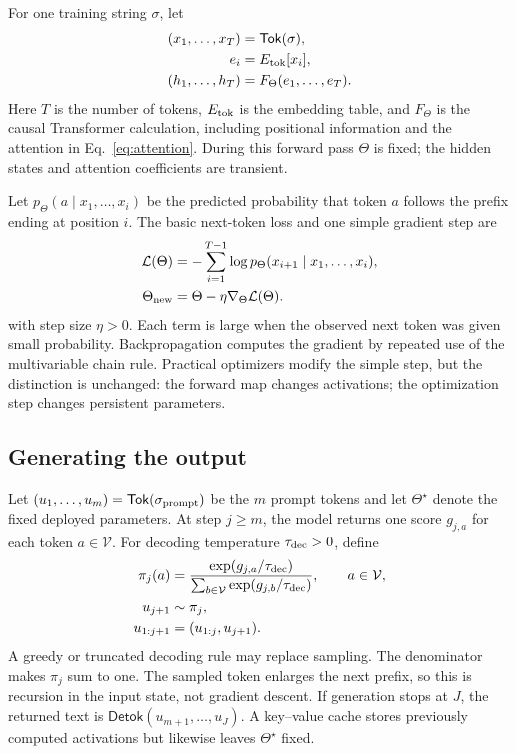 \documentclass[
  aps,
  reprint,
  superscriptaddress,
  floatfix,
  nofootinbib,
  longbibliography
]{revtex4-2}
\begin{document}
For one training string $\sigma$, let
\begin{equation}
\label{eq:app-forward-map}
\begin{aligned}
(x_1,\ldots,x_T)&=\mathsf{Tok}(\sigma),\\
e_i&=E_{\rm tok}[x_i],\\
(h_1,\ldots,h_T)&=F_\Theta(e_1,\ldots,e_T).
\end{aligned}
\end{equation}
Here $T$ is the number of tokens, $E_{\rm tok}$ is the embedding table, and
$F_\Theta$ is the causal Transformer calculation, including positional
information and the attention in Eq.~\eqref{eq:attention}.  During this forward
pass $\Theta$ is fixed; the hidden states and attention coefficients are
transient.

Let $p_\Theta(a\mid x_1,\ldots,x_i)$ be the predicted probability that token
$a$ follows the prefix ending at position $i$.  The basic next-token loss and
one simple gradient step are
\begin{equation}
\label{eq:app-training-update}
\begin{aligned}
\mathcal L(\Theta)
&=-\sum_{i=1}^{T-1}
\log p_\Theta(x_{i+1}\mid x_1,\ldots,x_i),\\
\Theta_{\rm new}&=\Theta-\eta\nabla_\Theta\mathcal L(\Theta).
\end{aligned}
\end{equation}
with step size $\eta>0$.  Each term is large when the observed next token was
given small probability.  Backpropagation computes the gradient by repeated
use of the multivariable chain rule.  Practical optimizers modify the simple
step, but the distinction is unchanged: the forward map changes activations;
the optimization step changes persistent parameters.

\subsection{Generating the output}
\label{app:generation}

Let $(u_1,\ldots,u_m)=\mathsf{Tok}(\sigma_{\rm prompt})$ be the $m$ prompt
tokens and let $\Theta^\star$ denote the fixed deployed parameters.  At step
$j\geq m$, the model returns one score $g_{j,a}$ for each token
$a\in\mathcal V$.  For decoding temperature $\tau_{\rm dec}>0$, define
%
\begin{align}
\pi_j(a)
&=
\frac{\exp(g_{j,a}/\tau_{\rm dec})}
{\sum_{b\in\mathcal V}
\exp(g_{j,b}/\tau_{\rm dec})},
\qquad a\in\mathcal V,
\nonumber\\
u_{j+1}&\sim\pi_j,
\nonumber\\
u_{1:j+1}&=(u_{1:j},u_{j+1}).
\label{eq:app-generation}
\end{align}
%
A greedy or truncated decoding rule may replace sampling.  The denominator
makes $\pi_j$ sum to one.  The sampled token enlarges the next prefix, so this
is recursion in the input state, not gradient descent.  If generation stops at
$J$, the returned text is $\mathsf{Detok}(u_{m+1},\ldots,u_J)$.  A key--value
cache stores previously computed activations but likewise leaves
$\Theta^\star$ fixed.
\end{document}
